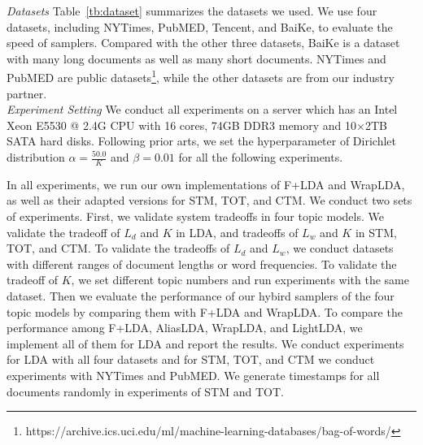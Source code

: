 \documentclass[10pt,journal,cspaper,compsoc]{IEEEtran}
\begin{document}
\noindent
{\large \em Datasets}
Table~\ref{tb:dataset} summarizes the datasets we used.
We use four datasets, including NYTimes, PubMED, Tencent, and BaiKe, to evaluate the speed of samplers.
Compared with the other three datasets, BaiKe is a dataset with many long documents as well as many short documents.
NYTimes and PubMED are public
datasets\footnote{\scriptsize https://archive.ics.uci.edu/ml/machine-learning-databases/bag-of-words/}, while the other datasets are from our industry partner.\\

\noindent
{\large \em Experiment Setting}
We conduct all experiments on a
server which has an Intel Xeon E5530 @ 2.4G CPU with
16 cores, 74GB DDR3 memory and 10$\times$2TB SATA
hard disks. Following prior arts, we set the hyperparameter of Dirichlet distribution $\alpha=\frac{50.0}{K}$ and
$\beta=0.01$ for all the following experiments.

In all experiments, we run our own implementations of F+LDA and WrapLDA, as well as their adapted versions
for STM, TOT, and CTM.  We conduct two sets of
experiments. First, we validate system tradeoffs in
four topic models. We validate the tradeoff of $L_d$ and $K$
in LDA, and tradeoffs of $L_w$ and $K$ in STM, TOT, and CTM.
To validate the tradeoffs of $L_d$ and $L_w$, we 
conduct datasets with different ranges of document lengths or word frequencies. 
To validate the tradeoff of $K$, we set different topic
numbers and run experiments with the same dataset.
Then we evaluate the performance of our hybird 
samplers of the four topic models by comparing them
with F+LDA and WrapLDA. To compare the performance
among F+LDA, AliasLDA, WrapLDA, and LightLDA, we
implement all of them for LDA and report the results. We conduct experiments for LDA with all four datasets and for STM, TOT, and CTM we conduct experiments
with NYTimes and PubMED. We generate timestamps 
for all documents randomly in experiments of STM
and TOT.\\
\end{document}
